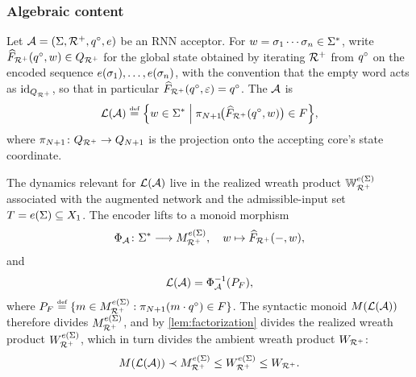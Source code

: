 \documentclass{article}
\begin{document}
\subsubsection{Algebraic content}\label{rem:acceptor-algebraic}
\begin{definition}


Let $\mathcal{A} = (\Sigma, {\mathcal{R}^{+}}, q^{\circ}, e)$ be an RNN acceptor. 
For $w = \sigma_1 \cdots \sigma_n \in \Sigma^*$, write $\widehat{F}_{{\mathcal{R}^{+}}}(q^{\circ}, w) \in Q_{{\mathcal{R}^{+}}}$ for the global state obtained by iterating ${\mathcal{R}^{+}}$ from $q^{\circ}$ on the encoded sequence $e(\sigma_1), \ldots, e(\sigma_n)$, with the convention that the empty word acts as $\mathrm{id}_{Q_{{\mathcal{R}^{+}}}}$, so that in particular $\widehat{F}_{{\mathcal{R}^{+}}}(q^{\circ}, \varepsilon) = q^{\circ}$.
The  $\mathcal{A}$ is
$$
\mathcal{L}(\mathcal{A}) \mathrel{\stackrel{\textnormal{\tiny def}}{=}} \Bigl\{ w \in \Sigma^* \Bigm| \pi_{N+1}\!\bigl(\widehat{F}_{{\mathcal{R}^{+}}}(q^{\circ}, w)\bigr) \in F \Bigr\},
$$
where $\pi_{N+1} \colon Q_{{\mathcal{R}^{+}}} \to Q_{N+1}$ is the projection onto the accepting core's state coordinate.
\end{definition}

The dynamics relevant for $\mathcal{L}(\mathcal{A})$ live in the realized wreath product $\mathbb{W}_{{\mathcal{R}^{+}}}^{e(\Sigma)}$ associated with the augmented network and the admissible-input set $T=e(\Sigma) \subseteq X_1$. 
The encoder lifts to a monoid morphism
$$
\Phi_{\mathcal{A}} \colon \Sigma^* \longrightarrow M_{{\mathcal{R}^{+}}}^{e(\Sigma)}, \quad
w \mapsto \widehat{F}_{{\mathcal{R}^{+}}}(-, w),
$$
and
$$
\mathcal{L}(\mathcal{A}) = \Phi_{\mathcal{A}}^{-1}(P_F),
$$
where $P_F \mathrel{\stackrel{\textnormal{\tiny def}}{=}} \{ m \in M_{{\mathcal{R}^{+}}}^{e(\Sigma)}: \pi_{N+1}(m \cdot q^{\circ}) \in F \}$. 
The syntactic monoid $M(\mathcal{L}(\mathcal{A}))$ therefore divides $M_{{\mathcal{R}^{+}}}^{e(\Sigma)}$, and by \cref{lem:factorization} divides the realized wreath product $W_{{\mathcal{R}^{+}}}^{e(\Sigma)}$, which in turn divides the ambient wreath product $W_{{\mathcal{R}^{+}}}$:
\begin{equation}\label{eq:langmon-divides-wreath}    
M(\mathcal{L}(\mathcal{A})) \prec M_{{\mathcal{R}^{+}}}^{e(\Sigma)} \leq W_{{\mathcal{R}^{+}}}^{e(\Sigma)} \leq W_{{\mathcal{R}^{+}}}.
\end{equation}
\end{document}
